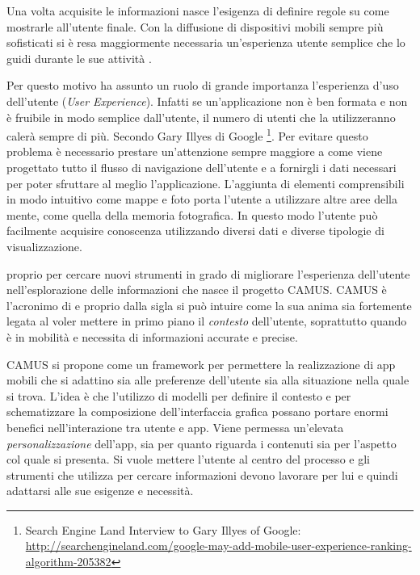 
Una volta acquisite le informazioni nasce l'esigenza di definire regole su come mostrarle all'utente finale. Con la diffusione di dispositivi mobili sempre più sofisticati si è resa maggiormente necessaria un'esperienza utente semplice che lo guidi durante le sue attività .


Per questo motivo ha assunto un ruolo di grande importanza l'esperienza d'uso dell'utente (\emph{User Experience}). Infatti se un'applicazione non è ben formata e non è fruibile in modo semplice dall'utente, il numero di utenti che la utilizzeranno calerà sempre di più. Secondo Gary Illyes di Google \footnote{Search Engine Land Interview to Gary Illyes of Google: \url{http://searchengineland.com/google-may-add-mobile-user-experience-ranking-algorithm-205382}}. Per evitare questo problema è necessario prestare un'attenzione sempre maggiore a come viene progettato tutto il flusso di navigazione dell'utente e a fornirgli i dati necessari per poter sfruttare al meglio l'applicazione. L'aggiunta di elementi comprensibili in modo intuitivo come mappe e foto porta l'utente a utilizzare altre aree della mente, come quella della memoria fotografica. In questo modo l'utente può facilmente acquisire conoscenza utilizzando diversi dati e diverse tipologie di visualizzazione.


\upe proprio per cercare nuovi strumenti in grado di migliorare l'esperienza dell'u\-ten\-te nell'esplorazione delle informazioni che nasce il progetto CAMUS. CAMUS è l'a\-cro\-ni\-mo di  e proprio dalla sigla si può intuire come la sua anima sia fortemente legata al voler mettere in primo piano il \emph{contesto} dell'utente, soprattutto quando è in mobilità e necessita di informazioni accurate e precise.

CAMUS si propone come un framework per permettere la realizzazione di app mobili che si adattino sia alle preferenze dell'utente sia alla situazione nella quale si trova. L'idea è che l'utilizzo di modelli per definire il contesto e per schematizzare la composizione dell'interfaccia grafica possano portare enormi benefici nell'interazione tra utente e app. Viene permessa un'elevata \emph{personalizzazione} dell'app, sia per quanto riguarda i contenuti sia per l'aspetto col quale si presenta. Si vuole mettere l'utente al centro del processo e gli strumenti che utilizza per cercare informazioni devono lavorare per lui e quindi adattarsi alle sue esigenze e necessità.

